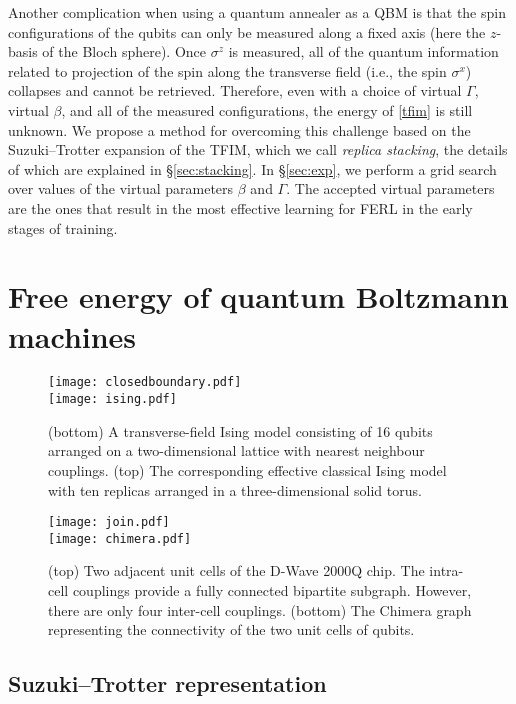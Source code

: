 \documentclass[pra,twocolumn,floatfix,superscriptaddress]{revtex4}
\begin{document}
Another complication when using a quantum annealer as a QBM is that the spin configurations of the qubits can only be measured along a fixed axis (here the $z$-basis of the Bloch sphere). Once $\sigma^z$ is measured, all of the quantum information related to projection of the spin along the transverse field (i.e., the spin $\sigma^x$) collapses and cannot be retrieved. Therefore, even with a choice of virtual $\Gamma$, virtual $\beta$, and all of the measured configurations, the energy of \eqref{tfim} is still unknown. We propose a method  for overcoming this challenge based on the Suzuki--Trotter expansion of the TFIM, which we call \emph{replica stacking}, the details of which are explained in \S\ref{sec:stacking}. In \S\ref{sec:exp}, we perform a grid search over values of the virtual parameters $\beta$ and $\Gamma$. The accepted virtual parameters are the ones that result in the most effective learning for FERL in the early stages of training. 

\section{Free energy of quantum Boltzmann machines} 

\begin{figure}
  \centering
    \texttt{[image: closedboundary.pdf]} \\ \vspace{0.5cm}
    \texttt{[image: ising.pdf]}
  \caption{\footnotesize{(bottom) A transverse-field Ising model consisting of 16 qubits arranged on a two-dimensional lattice with nearest neighbour couplings. (top) The corresponding effective classical Ising model with ten replicas arranged in a three-dimensional solid torus.}}
  \label{fig:effective}
\end{figure}

\begin{figure}
  \centering
    \texttt{[image: join.pdf]} \\ \vspace{0.5cm}
    \texttt{[image: chimera.pdf]}
  \caption{\footnotesize{(top) Two adjacent unit cells of the D-Wave 2000Q chip. The intra-cell couplings provide a fully connected bipartite subgraph. However, there are only four inter-cell couplings. (bottom) The Chimera graph representing the connectivity of the two unit cells of qubits.}}
  \label{fig:chimera}
\end{figure}

\subsection{Suzuki--Trotter representation}
\end{document}

